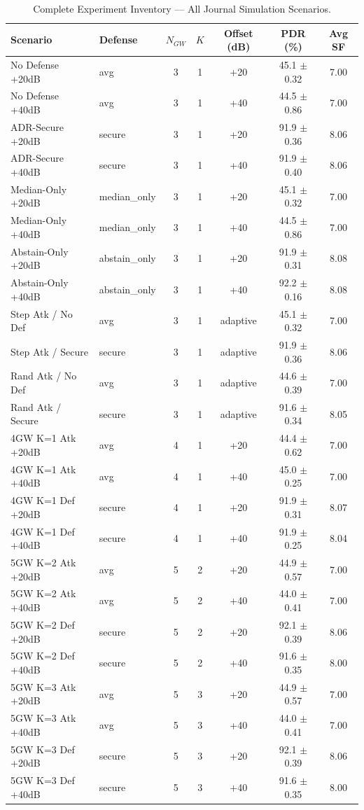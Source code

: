 \begin{table}[t]
\centering
\caption{Complete Experiment Inventory — All Journal Simulation Scenarios.}
\label{tab:full_inventory}
\begin{tabular}{llccccc}
\hline
Scenario & Defense & $N_{GW}$ & $K$ & Offset (dB) & PDR (\%) & Avg SF \\
\hline
No Defense +20dB & avg & 3 & 1 & +20 & 45.1 $\pm$ 0.32 & 7.00 \\
No Defense +40dB & avg & 3 & 1 & +40 & 44.5 $\pm$ 0.86 & 7.00 \\
ADR-Secure +20dB & secure & 3 & 1 & +20 & 91.9 $\pm$ 0.36 & 8.06 \\
ADR-Secure +40dB & secure & 3 & 1 & +40 & 91.9 $\pm$ 0.40 & 8.06 \\
Median-Only +20dB & median_only & 3 & 1 & +20 & 45.1 $\pm$ 0.32 & 7.00 \\
Median-Only +40dB & median_only & 3 & 1 & +40 & 44.5 $\pm$ 0.86 & 7.00 \\
Abstain-Only +20dB & abstain_only & 3 & 1 & +20 & 91.9 $\pm$ 0.31 & 8.08 \\
Abstain-Only +40dB & abstain_only & 3 & 1 & +40 & 92.2 $\pm$ 0.16 & 8.08 \\
Step Atk / No Def & avg & 3 & 1 & adaptive & 45.1 $\pm$ 0.32 & 7.00 \\
Step Atk / Secure & secure & 3 & 1 & adaptive & 91.9 $\pm$ 0.36 & 8.06 \\
Rand Atk / No Def & avg & 3 & 1 & adaptive & 44.6 $\pm$ 0.39 & 7.00 \\
Rand Atk / Secure & secure & 3 & 1 & adaptive & 91.6 $\pm$ 0.34 & 8.05 \\
4GW K=1 Atk +20dB & avg & 4 & 1 & +20 & 44.4 $\pm$ 0.62 & 7.00 \\
4GW K=1 Atk +40dB & avg & 4 & 1 & +40 & 45.0 $\pm$ 0.25 & 7.00 \\
4GW K=1 Def +20dB & secure & 4 & 1 & +20 & 91.9 $\pm$ 0.31 & 8.07 \\
4GW K=1 Def +40dB & secure & 4 & 1 & +40 & 91.9 $\pm$ 0.25 & 8.04 \\
5GW K=2 Atk +20dB & avg & 5 & 2 & +20 & 44.9 $\pm$ 0.57 & 7.00 \\
5GW K=2 Atk +40dB & avg & 5 & 2 & +40 & 44.0 $\pm$ 0.41 & 7.00 \\
5GW K=2 Def +20dB & secure & 5 & 2 & +20 & 92.1 $\pm$ 0.39 & 8.06 \\
5GW K=2 Def +40dB & secure & 5 & 2 & +40 & 91.6 $\pm$ 0.35 & 8.00 \\
5GW K=3 Atk +20dB & avg & 5 & 3 & +20 & 44.9 $\pm$ 0.57 & 7.00 \\
5GW K=3 Atk +40dB & avg & 5 & 3 & +40 & 44.0 $\pm$ 0.41 & 7.00 \\
5GW K=3 Def +20dB & secure & 5 & 3 & +20 & 92.1 $\pm$ 0.39 & 8.06 \\
5GW K=3 Def +40dB & secure & 5 & 3 & +40 & 91.6 $\pm$ 0.35 & 8.00 \\
\hline
\end{tabular}
\end{table}